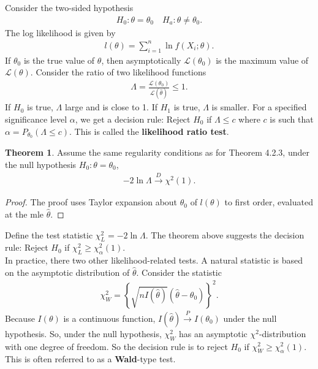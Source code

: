 \documentclass{book}
\theoremstyle{definition}
\newtheorem{thm}{Theorem}[section]
\newcommand{\lag}{\mathcal{L}}
\newcommand{\al}{\alpha}
\newcommand{\f}[2]{\frac{#1}{#2}}
\newcommand{\lc}{\left\{}
\newcommand{\rc}{\right\}}
\begin{document}
Consider the two-sided hypothesis
\begin{align}
H_0 : \theta = \theta_0 \quad H_a : \theta \neq \theta_0.
\end{align}
The log likelihood is given by
\begin{align}
l(\theta)  = \sum^n_{i=1} \ln f(X_i;\theta).
\end{align}
If $\theta_0$ is the true value of $\theta$, then asymptotically $\lag(\theta_0)$ is the maximum value of $\lag(\theta)$. Consider the ratio of two likelihood functions
\begin{align}
\Lambda = \f{\lag(\theta_0)}{\lag (\hat\theta)} \leq 1. 
\end{align}
If $H_0$ is true, $\Lambda$ large and is close to 1. If $H_1$ is true, $\Lambda$ is smaller. For a specified significance level $\al$, we get a decision rule: Reject $H_0$ if $\Lambda \leq c$ where $c$ is such that $\al = P_{\theta_0}(\Lambda \leq c)$. This is called the \textbf{likelihood ratio test}.





\begin{thm}
	Assume the same regularity conditions as for Theorem 4.2.3, under the null hypothesis $H_0 : \theta = \theta_0$,
	\begin{align}
	-2\ln \Lambda \xrightarrow{D} \chi^2(1).
	\end{align}	
\end{thm}


\begin{proof}
	The proof uses Taylor expansion about $\theta_0$ of $l(\theta)$ to first order, evaluated at the mle $\hat\theta$.  
\end{proof}


Define the test statistic $\chi^2_L = -2\ln \Lambda$. The theorem above suggests the decision rule: Reject $H_0$ if $\chi^2_L \geq \chi^2_\al(1)$.\\


In practice, there two other likelihood-related tests. A natural statistic is based on the asymptotic distribution of $\hat\theta$. Consider the statistic
\begin{align}
\chi^2_W = \lc \sqrt{nI (\hat\theta)} (\hat\theta - \theta_0) \rc^2.
\end{align}
Because $I(\theta)$ is a continuous function, $I(\hat\theta) \xrightarrow{P} I(\theta_0)$ under the null hypothesis. So, under the null hypothesis, $\chi_W^2$ has an asymptotic $\chi^2$-distribution with one degree of freedom. So the decision rule is to reject $H_0$ if $\chi^2_W \geq \chi^2_\al(1)$. This is often referred to as a \textbf{Wald}-type test. \\
\end{document}
